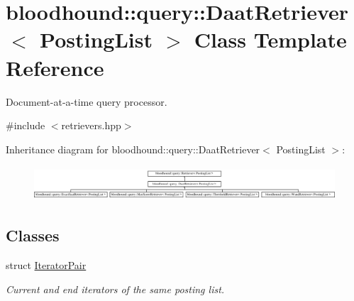 \hypertarget{classbloodhound_1_1query_1_1DaatRetriever}{}\section{bloodhound\+:\+:query\+:\+:Daat\+Retriever$<$ Posting\+List $>$ Class Template Reference}
\label{classbloodhound_1_1query_1_1DaatRetriever}


Document-\/at-\/a-\/time query processor.  




{\ttfamily \#include $<$retrievers.\+hpp$>$}

Inheritance diagram for bloodhound\+:\+:query\+:\+:Daat\+Retriever$<$ Posting\+List $>$\+:\begin{figure}[H]
\begin{center}
\leavevmode
\includegraphics[height=1.296296cm]{classbloodhound_1_1query_1_1DaatRetriever}
\end{center}
\end{figure}
\subsection*{Classes}
\begin{DoxyCompactItemize}
\item 
struct \mbox{\hyperlink{structbloodhound_1_1query_1_1DaatRetriever_1_1IteratorPair}{Iterator\+Pair}}
\begin{DoxyCompactList}\small\item\em Current and end iterators of the same posting list. \end{DoxyCompactList}\end{DoxyCompactItemize}
